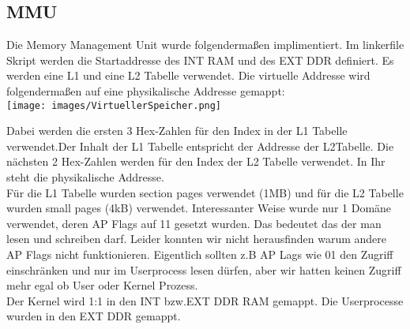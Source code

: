 \subsection{MMU}
	Die Memory Management Unit wurde folgendermaßen implimentiert. Im linkerfile Skript werden die Startaddresse des INT RAM und des EXT DDR definiert. Es werden eine L1 und eine L2 Tabelle verwendet. Die virtuelle Addresse wird folgendermaßen auf eine physikalische Addresse gemappt:\\
\texttt{[image: images/VirtuellerSpeicher.png]} 

Dabei werden die ersten 3 Hex-Zahlen für den Index in der L1 Tabelle verwendet.Der Inhalt der L1 Tabelle entspricht der Addresse der L2Tabelle. Die nächsten 2 Hex-Zahlen werden für den Index der L2 Tabelle verwendet. In Ihr steht die physikalische Addresse.\\
Für die L1 Tabelle wurden section pages verwendet (1MB) und für die L2 Tabelle wurden small pages (4kB) verwendet.
Interessanter Weise wurde nur 1 Domäne verwendet, deren AP Flags auf 11 gesetzt wurden. Das bedeutet das der man lesen und schreiben darf. Leider konnten wir nicht herausfinden warum andere AP Flags nicht funktionieren. Eigentlich sollten z.B AP Lags wie 01 den Zugriff einschränken und nur im Userprocess lesen dürfen, aber wir hatten keinen Zugriff mehr egal ob User oder Kernel Prozess.\\

Der Kernel wird 1:1 in den INT bzw.EXT DDR RAM gemappt. Die Userprocesse wurden in den EXT DDR gemappt.
\newpage
